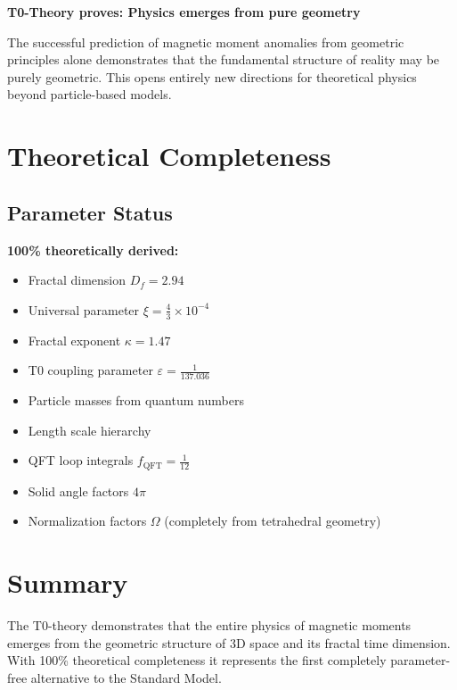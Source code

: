 \documentclass[12pt,a4paper]{article}
\numberwithin{equation}{section}
\newcommand{\xipar}{\xi}
\newcommand{\epsilonT}{\varepsilon}
\newcommand{\fQFT}{f_{\text{QFT}}}
\newcommand{\kappaT}{\kappa}
\newcommand{\Df}{D_f}
\newcommand{\Omegafactor}{\Omega}
\begin{document}
	\begin{tcolorbox}[title={\textbf{REVOLUTIONARY IMPACT}},colframe=purple,colback=purple!5]
		\textbf{T0-Theory proves: Physics emerges from pure geometry}
		
		The successful prediction of magnetic moment anomalies from geometric principles alone demonstrates that the fundamental structure of reality may be purely geometric. This opens entirely new directions for theoretical physics beyond particle-based models.
	\end{tcolorbox}
	
	\section{Theoretical Completeness}
	
	\subsection{Parameter Status}
	
	\textbf{100\% theoretically derived:}
	\begin{itemize}
		\item Fractal dimension $\Df = 2.94$
		\item Universal parameter $\xipar = \frac{4}{3} \times 10^{-4}$
		\item Fractal exponent $\kappaT = 1.47$
		\item T0 coupling parameter $\epsilonT = \frac{1}{137.036}$
		\item Particle masses from quantum numbers
		\item Length scale hierarchy
		\item QFT loop integrals $\fQFT = \frac{1}{12}$
		\item Solid angle factors $4\pi$
		\item Normalization factors $\Omegafactor$ (completely from tetrahedral geometry)
	\end{itemize}
	
	
	\section{Summary}
	
	The T0-theory demonstrates that the entire physics of magnetic moments emerges from the geometric structure of 3D space and its fractal time dimension. With 100\% theoretical completeness it represents the first completely parameter-free alternative to the Standard Model.
	
\end{document}
